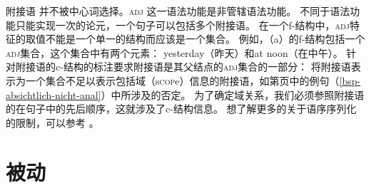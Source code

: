附接语
并不被中心词选择。\textsc{adj}
这一语法功能是非管辖语法功能。
不同于语法功能只能实现一次的论元，一个句子可以包括多个附接语。
在一个f-结构中，\textsc{adj}特征的取值不能是一个单一的结构而应该是一个集合。
例如，（a）的f-结构包括一个\textsc{adj}集合，这个集合中有两个元素：
yesterday（昨天）和at noon（在中午）。
\eal
{}
\ex\label{fstruc-david-devoured-a-sandwich-at-noon-yesterday} 
\zl
%
针对附接语的c-结构的标注要求附接语是其父结点的\textsc{adj}集合的一部分：
\ea
{}
\z
将附接语表示为一个集合不足以表示包括域（s\textsc{cop}e）信息的附接语，如第\pageref{bsp-absichtlich-nicht-anal}页中的例句（\ref{bsp-absichtlich-nicht-anal}）中所涉及的否定。
为了确定域关系，我们必须参照附接语的在句子中的先后顺序，这就涉及了c-结构信息。
想了解更多的关于语序序列化的限制，可以参考
。

\section{被动}
\label{Abschnitt-LFG-Passiv}


